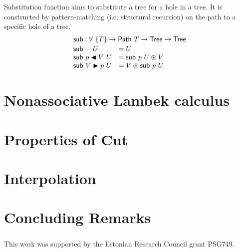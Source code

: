 \documentclass[runningheads]{llncs}
\newcommand{\cdast}{\circledast}
\newcommand{\btleft}{\blacktriangleleft}
\newcommand{\btright}{\blacktriangleright}
\newcommand{\Tree}{\mathsf{Tree}}
\newcommand{\path}[1]{\mathsf{Path} ~ #1}
\newcommand{\Sub}{\mathsf{sub}}
\newcommand{\sub}[2]{\mathsf{sub} ~ #1 ~ #2}
\begin{document}
Substitution function aims to substitute a tree for a hole in a tree. It is constructed by pattern-matching (i.e. structural recursion) on the path to a specific hole of a tree.
\[
\begin{array}{ll}
  \multicolumn{2}{l}{\Sub : \forall ~ \{T\} \to \path{T} \to \Tree \to \Tree}
  \\[2pt]
  \sub{\cdot}{U} &= U
  \\
  \sub{p \btleft V}{U} &= \sub{p}{U} \cdast V
  \\
  \sub{V \btright p}{U} &= V \cdast \sub{p}{U} 
\end{array}
\]


\section{Nonassociative Lambek calculus}\label{sec:calculus}

\section{Properties of Cut}

\section{Interpolation}

\section{Concluding Remarks}

\begin{credits}
\subsubsection{\ackname} This work was supported by the Estonian Research Council grant PSG749. 

\end{credits}
%
%
%


%
\end{document}
